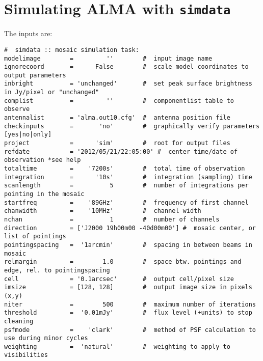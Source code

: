 
\section{Simulating ALMA with {\tt simdata}}
\label{section:sim.almasimmos}

The inputs are:
\small
\begin{verbatim}
#  simdata :: mosaic simulation task:
modelimage        =         ''        #  input image name
ignorecoord       =      False        #  scale model coordinates to output parameters
inbright          = 'unchanged'       #  set peak surface brightness in Jy/pixel or "unchanged"
complist          =         ''        #  componentlist table to observe
antennalist       = 'alma.out10.cfg'  #  antenna position file
checkinputs       =       'no'        #  graphically verify parameters [yes|no|only]
project           =      'sim'        #  root for output files
refdate           = '2012/05/21/22:05:00' #  center time/date of observation *see help
totaltime         =    '7200s'        #  total time of observation
integration       =      '10s'        #  integration (sampling) time
scanlength        =          5        #  number of integrations per pointing in the mosaic
startfreq         =    '89GHz'        #  frequency of first channel
chanwidth         =    '10MHz'        #  channel width
nchan             =          1        #  number of channels
direction         = ['J2000 19h00m00 -40d00m00'] #  mosaic center, or list of pointings
pointingspacing   =  '1arcmin'        #  spacing in between beams in mosaic
relmargin         =        1.0        #  space btw. pointings and edge, rel. to pointingspacing
cell              = '0.1arcsec'       #  output cell/pixel size
imsize            = [128, 128]        #  output image size in pixels (x,y)
niter             =        500        #  maximum number of iterations
threshold         =  '0.01mJy'        #  flux level (+units) to stop cleaning
psfmode           =    'clark'        #  method of PSF calculation to use during minor cycles
weighting         =  'natural'        #  weighting to apply to visibilities

\end{verbatim}
